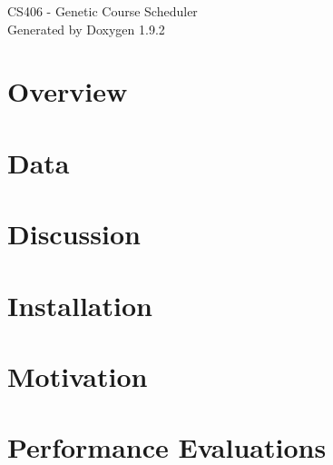 \documentclass[twoside]{book}
\newcommand{\+}{\discretionary{\mbox{\scriptsize$\hookleftarrow$}}{}{}}
\newcommand{\clearemptydoublepage}{%
    \newpage{\pagestyle{empty}\cleardoublepage}%
  }
\begin{document}
  \raggedbottom
    \hypersetup{pageanchor=false,
                bookmarksnumbered=true,
                pdfencoding=unicode
               }
  \begin{titlepage}
  \vspace*{7cm}
  \begin{center}%
  {\Large CS406 -\/ Genetic Course Scheduler}\\
  \vspace*{1cm}
  {\large Generated by Doxygen 1.9.2}\\
  \end{center}
  \end{titlepage}
  \clearemptydoublepage
  \tableofcontents
  \clearemptydoublepage
  \hypersetup{pageanchor=true}
\chapter{Overview}
\label{index}\hypertarget{index}{}
\chapter{Data}
\label{md_pages_data}

\chapter{Discussion}
\label{md_pages_discussion}

\chapter{Installation}
\label{md_pages_installation}

\chapter{Motivation}
\label{md_pages_motivation}

\chapter{Performance Evaluations}
\label{md_pages_performance_evaluation}

\end{document}
